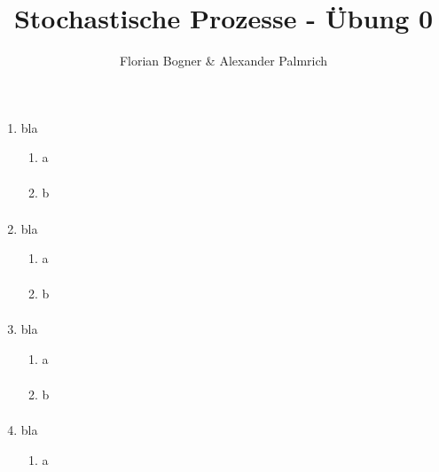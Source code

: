 \documentclass[a4paper,11pt,notitlepage,fullpage]{article}
\begin{document}
\author{Florian Bogner \& Alexander Palmrich}
\title{Stochastische Prozesse - Übung 0}
\maketitle

\begin{enumerate}
\setcounter{enumi}{00}


\item bla
\begin{enumerate}
\item a
\begin{align*}
\end{align*}

\item b
\begin{align*}
\end{align*}
\end{enumerate}


\item bla
\begin{enumerate}
\item a
\begin{align*}
\end{align*}

\item b
\begin{align*}
\end{align*}
\end{enumerate}

\item bla
\begin{enumerate}
\item a
\begin{align*}
\end{align*}

\item b
\begin{align*}
\end{align*}
\end{enumerate}

\item bla
\begin{enumerate}
\item a
\begin{align*}
\end{align*}


\end{enumerate}
\end{enumerate}
\end{document}
